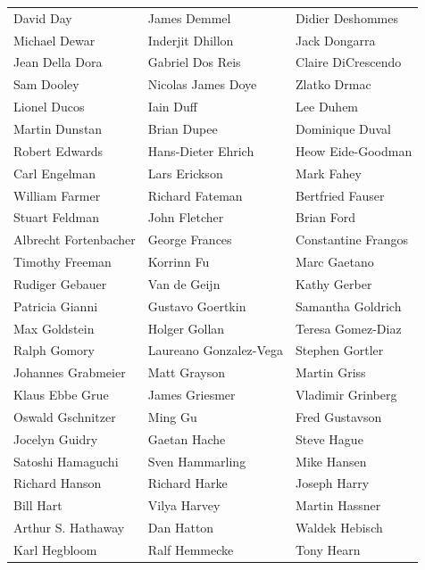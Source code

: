 \begin{tabular}{lll}
David Day              & James Demmel           & Didier Deshommes\\
Michael Dewar          & Inderjit Dhillon       & Jack Dongarra\\
Jean Della Dora        & Gabriel Dos Reis       & Claire DiCrescendo\\
Sam Dooley             & Nicolas James Doye     & Zlatko Drmac\\
Lionel Ducos           & Iain Duff              & Lee Duhem\\
Martin Dunstan         & Brian Dupee            & Dominique Duval\\
Robert Edwards         & Hans-Dieter Ehrich     & Heow Eide-Goodman\\
Carl Engelman          & Lars Erickson          & Mark Fahey\\
William Farmer         & Richard Fateman        & Bertfried Fauser\\
Stuart Feldman         & John Fletcher          & Brian Ford\\
Albrecht Fortenbacher  & George Frances         & Constantine Frangos\\
Timothy Freeman        & Korrinn Fu             & Marc Gaetano\\
Rudiger Gebauer        & Van de Geijn           & Kathy Gerber\\
Patricia Gianni        & Gustavo Goertkin       & Samantha Goldrich\\
Max Goldstein          & Holger Gollan          & Teresa Gomez-Diaz\\
Ralph Gomory           & Laureano Gonzalez-Vega & Stephen Gortler\\
Johannes Grabmeier     & Matt Grayson           & Martin Griss\\
Klaus Ebbe Grue        & James Griesmer         & Vladimir Grinberg\\
Oswald Gschnitzer      & Ming Gu                & Fred Gustavson\\
Jocelyn Guidry         & Gaetan Hache           & Steve Hague\\
Satoshi Hamaguchi      & Sven Hammarling        & Mike Hansen\\
Richard Hanson         & Richard Harke          & Joseph Harry\\
Bill Hart              & Vilya Harvey           & Martin Hassner\\
Arthur S. Hathaway     & Dan Hatton             & Waldek Hebisch\\
Karl Hegbloom          & Ralf Hemmecke          & Tony Hearn\\

\end{tabular}
